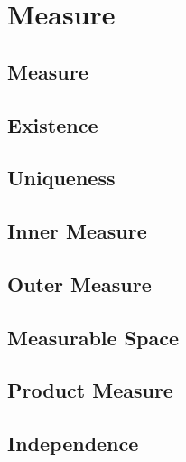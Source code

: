 \chapter{Measure}

\section{Measure}

\section{Existence}

\section{Uniqueness}

\section{Inner Measure}

\section{Outer Measure}

\section{Measurable Space}

\section{Product Measure}

\section{Independence}











